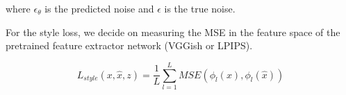 \noindent where $\epsilon_\theta$ is the predicted noise and $\epsilon$ is the true noise.

\vspace{1em}

\noindent For the style loss, we decide on measuring the MSE in the feature space of the pretrained feature extractor network (VGGish or LPIPS).

\begin{equation}
    L_{style}(x, \hat{x}, z) = 
    \frac{1}{L}\sum_{l=1}^{L} MSE(\phi_l(x), \phi_l(\hat{x}))
\end{equation}